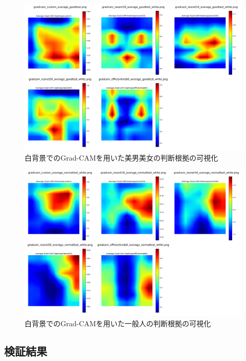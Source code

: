 \documentclass[a4paper,11pt,titlepage]{jsarticle}
\begin{document}
\begin{figure}[H]
    \centering
    \includegraphics[width=1.1\textwidth]{white_combined_images_good.png}
    \caption{白背景でのGrad-CAMを用いた美男美女の判断根拠の可視化}
    \label{fig:gradcam_good_white}
\end{figure}
\begin{figure}[H]
    \centering
    \includegraphics[width=1.1\textwidth]{white_combined_images_normal.png}
    \caption{白背景でのGrad-CAMを用いた一般人の判断根拠の可視化}
    \label{fig:gradcam_normal_white}
\end{figure}


\subsection{検証結果}
\label{label:検証結果}
\end{document}
